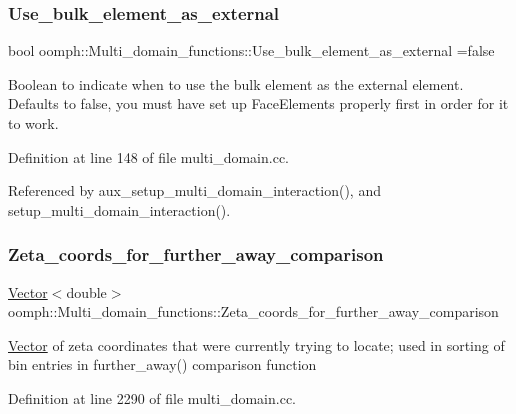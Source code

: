 \mbox{\label{namespaceoomph_1_1Multi__domain__functions_abc1119753cf68493ba6ea43c2a8bc378}} 
\subsubsection{\texorpdfstring{Use\+\_\+bulk\+\_\+element\+\_\+as\+\_\+external}{Use\_bulk\_element\_as\_external}}
{\footnotesize\ttfamily bool oomph\+::\+Multi\+\_\+domain\+\_\+functions\+::\+Use\+\_\+bulk\+\_\+element\+\_\+as\+\_\+external =false}



Boolean to indicate when to use the bulk element as the external element. Defaults to false, you must have set up Face\+Elements properly first in order for it to work. 



Definition at line 148 of file multi\+\_\+domain.\+cc.



Referenced by aux\+\_\+setup\+\_\+multi\+\_\+domain\+\_\+interaction(), and setup\+\_\+multi\+\_\+domain\+\_\+interaction().

\mbox{\label{namespaceoomph_1_1Multi__domain__functions_a5f14db731fddbd057f4099fbdba95cc0}} 
\subsubsection{\texorpdfstring{Zeta\+\_\+coords\+\_\+for\+\_\+further\+\_\+away\+\_\+comparison}{Zeta\_coords\_for\_further\_away\_comparison}}
{\footnotesize\ttfamily \hyperlink{classoomph_1_1Vector}{Vector}$<$double$>$ oomph\+::\+Multi\+\_\+domain\+\_\+functions\+::\+Zeta\+\_\+coords\+\_\+for\+\_\+further\+\_\+away\+\_\+comparison}

\hyperlink{classoomph_1_1Vector}{Vector} of zeta coordinates that we\textquotesingle{}re currently trying to locate; used in sorting of bin entries in further\+\_\+away() comparison function 

Definition at line 2290 of file multi\+\_\+domain.\+cc.

